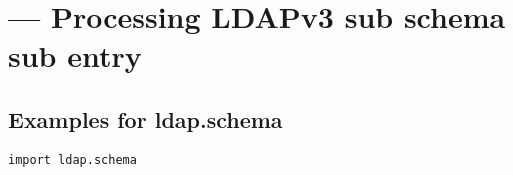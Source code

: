 
\section{ ---
  Processing LDAPv3 sub schema sub entry }




\subsection{Examples for ldap.schema \label{ldap.schema-example}}

\begin{verbatim}
import ldap.schema

\end{verbatim}


